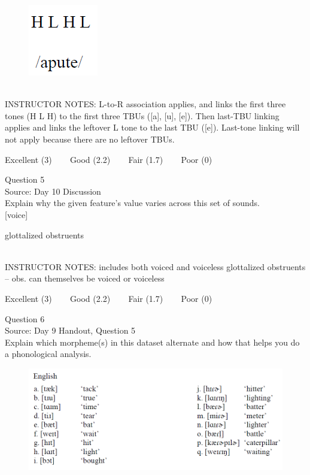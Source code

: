 \documentclass[12pt]{article}
\begin{document}
\begin{figure}[H]
\includegraphics{../images/mendetone_d.png}
\end{figure}

~\\
INSTRUCTOR NOTES: L-to-R association applies, and links the first three tones (H L H) to the first three TBUs ([a], [u], [e]). Then last-TBU linking applies and links the leftover L tone to the last TBU ([e]). Last-tone linking will not apply because there are no leftover TBUs.


\vfill
Excellent (3) ~~~ Good (2.2) ~~~ Fair (1.7) ~~~ Poor (0)
\newpage

{\large Question 5}\\

Source: Day 10 Discussion\\

Explain why the given feature's value varies across this set of sounds.\\

{[voice]}

glottalized obstruents


~\\
INSTRUCTOR NOTES: includes both voiced and voiceless glottalized obstruents -- obs. can themselves be voiced or voiceless


\vfill
Excellent (3) ~~~ Good (2.2) ~~~ Fair (1.7) ~~~ Poor (0)
\newpage

{\large Question 6}\\

Source: Day 9 Handout, Question 5\\

Explain which morpheme(s) in this dataset alternate and how that helps you do a phonological analysis.\\

\begin{figure}[H]
\includegraphics{../images/english_t_flap.png}
\end{figure}
\end{document}

